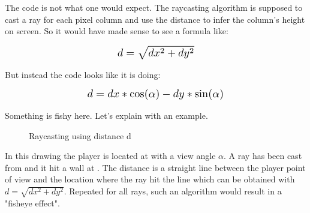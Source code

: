 The code is not what one would expect. The raycasting algorithm is supposed to cast a ray for each pixel column and use the distance  to infer the column's height on screen. So it would have made sense to see a formula like:
\begin{figure}[H]
  \centering
  \begin{equation*}
    \scalebox{1.3}{
$ d = \sqrt{dx^2 + dy^2}$ 
 }
  \end{equation*}
\end{figure}
But instead the code looks like it is doing: 
\begin{figure}[H]
  \centering
  \begin{equation*}
    \scalebox{1.3}{
$d = dx * \cos(\alpha) - dy * \sin(\alpha) $
 }
  \end{equation*}
\end{figure}
Something is fishy here. Let's explain with an example.\\
\par
\begin{figure}[H]
\centering
 
 \caption{Raycasting using distance d} \label{fig:Raycasting2}
\end{figure}

In this drawing the player is located at  with a view angle \begin{math}\alpha\end{math}. A ray has been cast from  and it hit a wall at . The distance  is a straight line between the player point of view and the location where the ray hit the line which can be obtained with $d = \sqrt{dx^2 + dy^2}$. Repeated for all rays, such an algorithm would result in a "fisheye effect".









